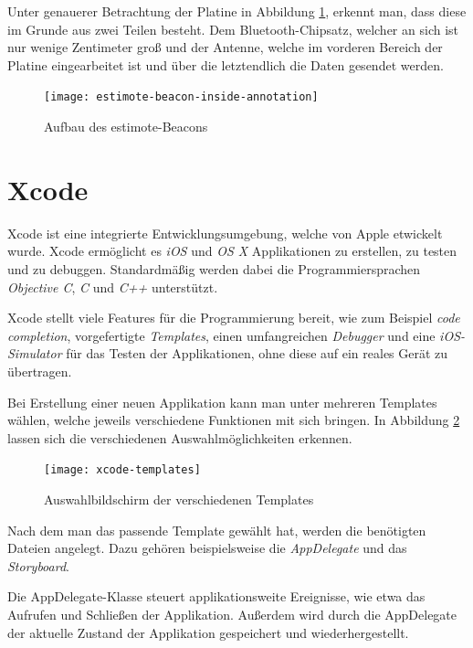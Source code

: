 Unter genauerer Betrachtung der Platine in Abbildung \ref{estimote-beacon-inside-annotations}, erkennt man, dass diese im Grunde aus zwei Teilen besteht.
Dem Bluetooth-Chipsatz, welcher an sich ist nur wenige Zentimeter groß und der Antenne, welche im vorderen Bereich der Platine eingearbeitet ist und über die letztendlich die Daten gesendet werden.

\begin{figure}[h!]
	\centering
	\texttt{[image: estimote-beacon-inside-annotation]}
	\caption{Aufbau des estimote-Beacons}
	\label{estimote-beacon-inside-annotations}
\end{figure}



\section{Xcode}
\label{sec:tools:xcode}
Xcode ist eine integrierte Entwicklungsumgebung, welche von Apple etwickelt wurde. Xcode ermöglicht es \emph{iOS} und \emph{OS X} Applikationen zu erstellen, zu testen und zu debuggen.
Standardmäßig werden dabei die Programmiersprachen \emph{Objective C}, \emph{C} und \emph{C++} unterstützt.

Xcode stellt viele Features für die Programmierung bereit, wie zum Beispiel \emph{code completion}, vorgefertigte \emph{Templates}, einen umfangreichen \emph{Debugger} und eine \emph{iOS-Simulator} für das Testen der Applikationen, ohne diese auf ein reales Gerät zu übertragen.

Bei Erstellung einer neuen Applikation kann man unter mehreren Templates wählen, welche jeweils verschiedene Funktionen mit sich bringen. In Abbildung \ref{xcode-templates} lassen sich die verschiedenen Auswahlmöglichkeiten erkennen.

\begin{figure}[htb!]
		\centering
	\texttt{[image: xcode-templates]}
	\caption{Auswahlbildschirm der verschiedenen Templates}
	\label{xcode-templates}
\end{figure}

Nach dem man das passende Template gewählt hat, werden die benötigten Dateien angelegt.
Dazu gehören beispielsweise die \emph{AppDelegate} und das \emph{Storyboard}.

Die AppDelegate-Klasse steuert applikationsweite Ereignisse, wie etwa das Aufrufen und Schließen der Applikation. Außerdem wird durch die AppDelegate der aktuelle Zustand der Applikation gespeichert und wiederhergestellt.

